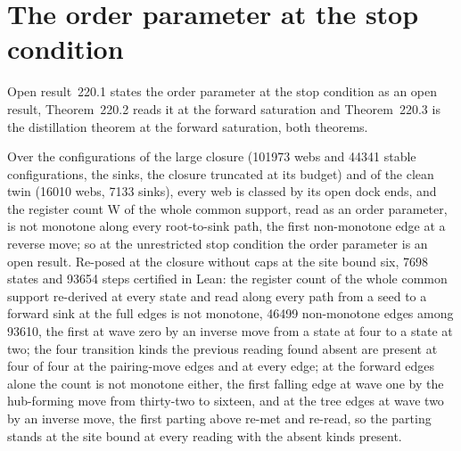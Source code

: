 \par\medskip{}\label{narr:close:11-3}\par
\section{The order parameter at the stop condition}\label{mod:XI-4-order-parameter-at-the-stop-condition}
\label{narr:open:11-4}Open result~220.1 states the order parameter at the stop condition as an open result, Theorem~220.2 reads it at the forward saturation and Theorem~220.3 is the distillation theorem at the forward saturation, both theorems.
\begin{chwall}\label{box:XI-4-order-parameter-at-the-stop-condition:1}
Over the configurations of the large closure (101973 webs and 44341 stable configurations, the sinks, the closure truncated at its budget) and of the clean twin (16010 webs, 7133 sinks), every web is classed by its open dock ends, and the register count W of the whole common support, read as an order parameter, is not monotone along every root-to-sink path, the first non-monotone edge at a reverse move; so at the unrestricted stop condition the order parameter is an open result.
Re-posed at the closure without caps at the site bound six, 7698 states and 93654 steps certified in Lean: the register count of the whole common support re-derived at every state and read along every path from a seed to a forward sink at the full edges is not monotone, 46499 non-monotone edges among 93610, the first at wave zero by an inverse move from a state at four to a state at two; the four transition kinds the previous reading found absent are present at four of four at the pairing-move edges and at every edge; at the forward edges alone the count is not monotone either, the first falling edge at wave one by the hub-forming move from thirty-two to sixteen, and at the tree edges at wave two by an inverse move, the first parting above re-met and re-read, so the parting stands at the site bound at every reading with the absent kinds present.
\end{chwall}
